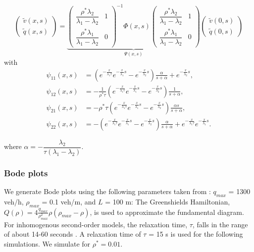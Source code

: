 \documentclass[preprint]{elsarticle}
\begin{document}
\begin{equation}
\begin{pmatrix}
\widetilde{v}(x,s) \\ \widetilde{q}(x,s)
\end{pmatrix} = \underbrace{ \begin{pmatrix}
\dfrac{\rho^*\lambda_2}{\lambda_1-\lambda_2} & 1\\
\dfrac{\rho^*\lambda_1}{\lambda_1-\lambda_2} & 0
\end{pmatrix}^{-1} \Phi(x,s) 
\begin{pmatrix}
\dfrac{\rho^*\lambda_2}{\lambda_1-\lambda_2} & 1\\
\dfrac{\rho^*\lambda_1}{\lambda_1-\lambda_2} & 0
\end{pmatrix} }_\text{$\Psi (x,s)$} \begin{pmatrix}
\widetilde{v}(0,s) \\ \widetilde{q}(0,s)
\end{pmatrix}
\end{equation}
with
\begin{subequations}
\begin{align}
\psi_{11}(x,s) &=\left(e^{-\frac{x}{\lambda_{1}\tau}}e^{-\frac{x}{\lambda_{1}}s}-e^{-\frac{x}{\lambda_{2}}s}\right)\frac{\alpha}{s+\alpha}+e^{-\frac{x}{\lambda_{2}}s}, \\
\psi_{12}(x,s)&=-\frac{1}{\rho^* \tau}\left(e^{-\frac{x}{\lambda_{1}\tau}}e^{-\frac{x}{\lambda_{1}}s}-e^{-\frac{x}{\lambda_{2}}s}\right)\frac{1}{s+\alpha}, \\
\psi_{21}(x,s)&=-\rho^{*} \tau\left(e^{-\frac{x}{\lambda_{1}\tau}}e^{-\frac{x}{\lambda_{1}}s}-e^{-\frac{x}{\lambda_{2}}s}\right)\frac{\alpha s}{s+\alpha}, \\
\psi_{22}(x,s)&=-\left(e^{-\frac{x}{\lambda_{1}\tau}}e^{-\frac{x}{\lambda_{1}}s}-e^{-\frac{x}{\lambda_{2}}s}\right)\frac{\alpha}{s+\alpha}+e^{-\frac{x}{\lambda_{1}\tau}}e^{-\frac{x}{\lambda_{1}}s}.
\end{align}
\end{subequations}

where $\alpha = -\dfrac{\lambda_2}{\tau(\lambda_1 - \lambda_2)}$. 

\subsubsection{Bode plots}

We generate Bode plots using the following parameters taken from \cite{Hofleitner}: $q_{max}$ = 1300 veh/h, $\rho_{max}$ = 0.1 veh/m, and $L$ = 100 m: The Greenshields Hamiltonian, $Q( \rho) = 4 \frac{q_{max}}{\rho_{max}^2}\rho (\rho_{max} - \rho)$, is used to approximate the fundamental diagram. For inhomogenous second-order models, the relaxation time, $\tau$, falls in the range of about 14-60 seconds \cite{Fan}. A relaxation time of $\tau$ = 15 s is used for the following simulations. We simulate for $\rho^* = 0.01$. \\
\end{document}
